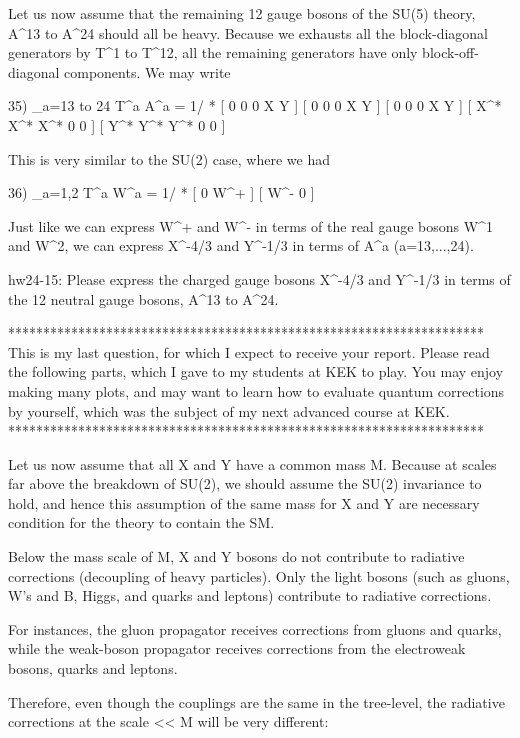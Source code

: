 \documentclass[12pt]{article}
\begin{document}
Let us now assume that the remaining 12 gauge bosons of the SU(5)
theory, A^13 to A^24 should all be heavy.  Because we exhausts all
the block-diagonal generators by T^1 to T^12, all the remaining
generators have only block-off-diagonal components.  We may write

35) \Sum_{a=13 to 24} T^a A^a = 1/
                              * [ 0   0   0   X Y ]
                                [ 0   0   0   X Y ]
                                [ 0   0   0   X Y ]
                                [ X^* X^* X^* 0 0 ]
                                [ Y^* Y^* Y^* 0 0 ]

This is very similar to the SU(2) case, where we had

36) \Sum_{a=1,2} T^a W^a = 1/ * [ 0   W^+ ]
                                        [ W^- 0   ]

Just like we can express W^+ and W^- in terms of the real gauge bosons
W^1 and W^2, we can express X^{-4/3} and Y^{-1/3} in terms of A^a
(a=13,...,24).

hw24-15: Please express the charged gauge bosons X^{-4/3} and Y^{-1/3}
in terms of the 12 neutral gauge bosons, A^13 to A^24.

********************************************************************
This is my last question, for which I expect to receive your report.
Please read the following parts, which I gave to my students at KEK
to play.  You may enjoy making many plots, and may want to learn how
to evaluate quantum corrections by yourself, which was the subject
of my next advanced course at KEK.
********************************************************************

Let us now assume that all X and Y have a common mass M.  Because at
scales far above the breakdown of SU(2), we should assume the SU(2)
invariance to hold, and hence this assumption of the same mass for
X and Y are necessary condition for the theory to contain the SM.

Below the mass scale of M, X and Y bosons do not contribute to radiative
corrections (decoupling of heavy particles).  Only the light bosons
(such as gluons, W's and B, Higgs, and quarks and leptons) contribute
to radiative corrections.

For instances, the gluon propagator receives corrections from gluons
and quarks, while the weak-boson propagator receives corrections
from the electroweak bosons, quarks and leptons.

Therefore, even though the couplings are the same in the tree-level,
the radiative corrections at the scale \mu << M will be very different:
\end{document}
